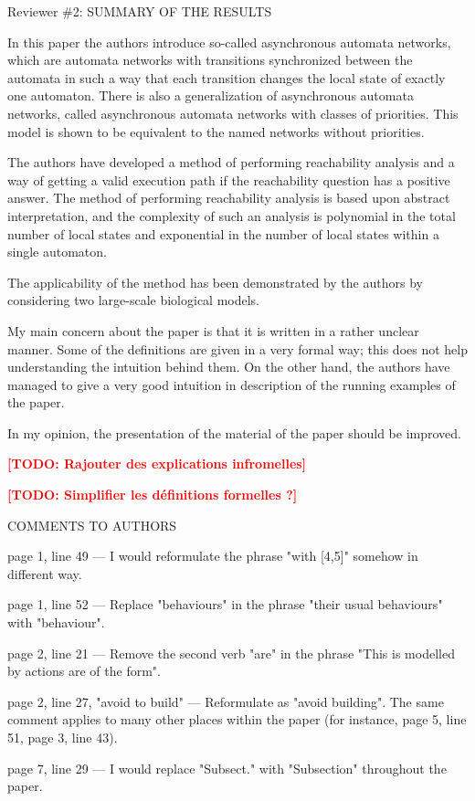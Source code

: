 \documentclass[11pt]{article}
\newcommand{\todo}[1]{\textcolor{red}{\textbf{[TODO: #1]}}}
\begin{document}
Reviewer \#2: SUMMARY OF THE RESULTS

In this paper the authors introduce so-called asynchronous automata networks, which are automata networks with transitions synchronized between the automata in such a way that each transition changes the local state of exactly one automaton. There is also a generalization of asynchronous automata networks, called asynchronous automata networks with classes of priorities. This model is shown to be equivalent to the named networks without priorities.

The authors have developed a method of performing reachability analysis and a way of getting a valid execution path if the reachability question has a positive answer. The method of performing reachability analysis is based upon abstract interpretation, and the complexity of such an analysis is polynomial in the total number of local states and exponential in the number of local states within a single automaton.

The applicability of the method has been demonstrated by the authors by considering two large-scale biological models.

My main concern about the paper is that it is written in a rather unclear manner. Some of the definitions are given in a very formal way; this does not help understanding the intuition behind them. On the other hand, the authors have managed to give a very good intuition in description of the running examples of the paper.

In my opinion, the presentation of the material of the paper should be improved.

\todo{Rajouter des explications infromelles}

\todo{Simplifier les définitions formelles ?}

COMMENTS TO AUTHORS

page 1, line 49 ---
I would reformulate the phrase "with [4,5]" somehow in different way.

page 1, line 52 ---
Replace "behaviours" in the phrase "their usual behaviours" with "behaviour".

page 2, line 21 ---
Remove the second verb "are" in the phrase "This is modelled by actions are of the form".

page 2, line 27, "avoid to build" ---
Reformulate as "avoid building".
The same comment applies to many other places within the paper (for instance, page 5, line 51, page 3, line 43).

page 7, line 29 ---
I would replace "Subsect." with "Subsection" throughout the paper.
\end{document}
